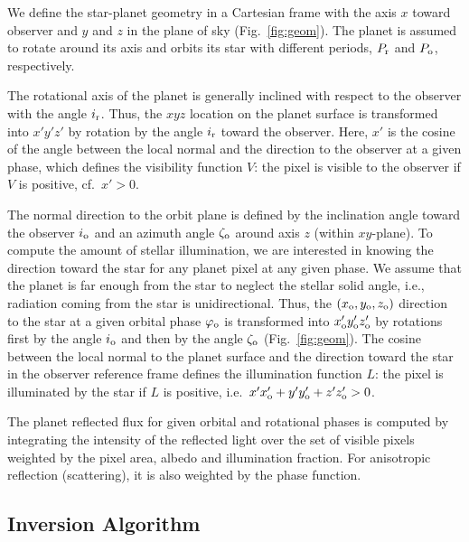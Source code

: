\documentclass{emulateapj}
\begin{document}
We define the star-planet geometry in a Cartesian frame with the axis $x$ toward observer 
and $y$ and $z$ in the plane of sky (Fig.~\ref{fig:geom}). 
The planet is assumed to rotate around its axis and orbits its star with different
periods, $P_{\rm r}$ and $P_{\rm o}$, respectively. 

The rotational axis of the planet is generally
inclined with respect to the observer with the angle $i_{\rm r}$. Thus, the $xyz$ location
on the planet surface is transformed into $x'y'z'$ 
by rotation by the angle $i_{\rm r}$ toward the observer.
Here, $x'$ is the cosine of the angle between the local normal and the direction to the observer
at a given phase, which defines the visibility function $V$:
the pixel is visible to the observer if $V$ is positive, cf.\ $x'>0$.

The normal direction to the orbit plane is defined by the inclination angle toward the observer 
$i_{\rm o}$ and an azimuth angle $\zeta_{\rm o}$ around axis $z$ (within $xy$-plane). 
To compute the amount of stellar illumination, we are interested in knowing 
the direction toward the star for any planet pixel at any given phase. We assume that the planet
is far enough from the star to neglect the stellar solid angle, i.e., radiation
coming from the star is unidirectional.
Thus, the $(x_{\rm o},y_{\rm o},z_{\rm o})$ direction to the star at a given orbital phase
$\varphi_{\rm o}$ is transformed into $x'_{\rm o}y'_{\rm o}z'_{\rm o}$ by rotations
first by the angle $i_{\rm o}$ and then by the angle $\zeta_{\rm o}$ (Fig.~\ref{fig:geom}).
The cosine between the local normal to the planet surface and the direction toward the star
in the observer reference frame
defines the illumination function $L$: the pixel is illuminated by the star if $L$ is positive, 
i.e.\ $x'x'_{\rm o} + y'y'_{\rm o} + z'z'_{\rm o} > 0$.

The planet reflected flux for given orbital and rotational phases is computed by integrating the intensity 
of the reflected light over the set of visible pixels  weighted by the pixel area, albedo and illumination
fraction. For anisotropic reflection (scattering), it is also weighted by the phase function.


\subsection{Inversion Algorithm}\label{sec:inv}
\end{document}
